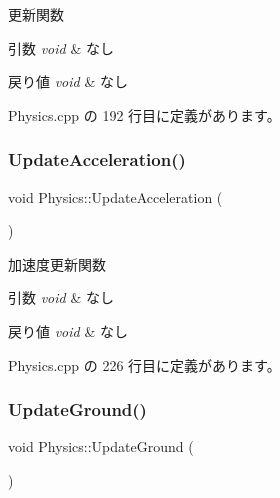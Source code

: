 更新関数 


\begin{DoxyParams}{引数}
{\em void} & なし \\
\hline
\end{DoxyParams}

\begin{DoxyRetVals}{戻り値}
{\em void} & なし \\
\hline
\end{DoxyRetVals}


 Physics.\+cpp の 192 行目に定義があります。

\mbox{\label{class_physics_a122041053c2c4e69cdf6dc92076e1d79}} 
\subsubsection{\texorpdfstring{Update\+Acceleration()}{UpdateAcceleration()}}
{\footnotesize\ttfamily void Physics\+::\+Update\+Acceleration (\begin{DoxyParamCaption}{ }\end{DoxyParamCaption})\hspace{0.3cm}{\ttfamily [private]}}



加速度更新関数 


\begin{DoxyParams}{引数}
{\em void} & なし \\
\hline
\end{DoxyParams}

\begin{DoxyRetVals}{戻り値}
{\em void} & なし \\
\hline
\end{DoxyRetVals}


 Physics.\+cpp の 226 行目に定義があります。

\mbox{\label{class_physics_a085300405839f6de506bfe5d0a57fdd5}} 
\subsubsection{\texorpdfstring{Update\+Ground()}{UpdateGround()}}
{\footnotesize\ttfamily void Physics\+::\+Update\+Ground (\begin{DoxyParamCaption}{ }\end{DoxyParamCaption})\hspace{0.3cm}{\ttfamily [private]}}



